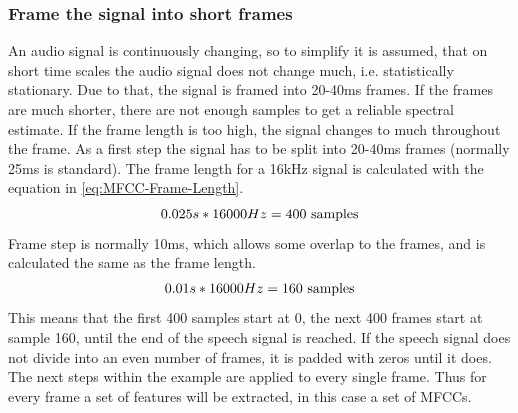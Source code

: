 \subsubsection{Frame the signal into short frames}
An audio signal is continuously changing, so to simplify it is assumed, that on short time scales the audio signal does not change much, i.e. statistically stationary. Due to that, the signal is framed into 20-40ms frames. If the frames are much shorter, there are not enough samples to get a reliable spectral estimate. If the frame length is too high, the signal changes to much throughout the frame.
\newline 
\newline
As a first step the signal has to be split into 20-40ms frames (normally 25ms is standard). The frame length for a 16kHz signal is calculated with the equation in \ref{eq:MFCC-Frame-Length}. 
\begin{equation}
    \centering
    0.025s * 16000Hz = 400 \ \text{samples}
    \label{eq:MFCC-Frame-Length}
\end{equation}
Frame step is normally 10ms, which allows some overlap to the frames, and is calculated the same as the frame length.
\begin{equation}
    \centering
    0.01s * 16000Hz = 160 \ \text{samples}
    \label{eq:MFCC-Frame-Step}
\end{equation}
This means that the first 400 samples start at 0, the next 400 frames start at sample 160, until the end of the speech signal is reached. If the speech signal does not divide into an even number of frames, it is padded with zeros until it does. The next steps within the example are applied to every single frame. Thus for every frame a set of features will be extracted, in this case a set of \glspl{MFCC}.

